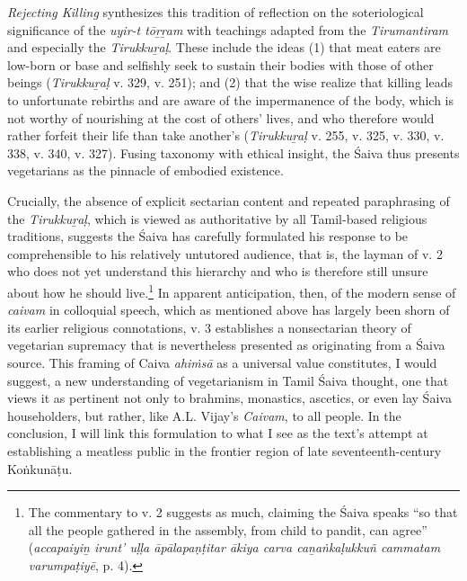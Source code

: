 \emph{Rejecting Killing} synthesizes this tradition of reflection on the soteriological significance of the \emph{uyir-t tōṟṟam} with teachings adapted from the \emph{{Tirumantiram}} and especially the \emph{{Tirukkuṟaḷ}}. These include the ideas (1) that meat eaters are low-born or base and selfishly seek to sustain their bodies with those of other beings (\emph{{Tirukkuṟaḷ}} v. 329, v. 251); and (2) that the wise realize that killing leads to unfortunate rebirths and are aware of the impermanence of the body, which is not worthy of nourishing at the cost of others’ lives, and who therefore would rather forfeit their life than take another’s (\emph{{Tirukkuṟaḷ}} v. 255, v. 325, v. 330, v. 338, v. 340, v. 327). Fusing taxonomy with ethical insight, the Śaiva thus presents vegetarians as the pinnacle of embodied existence. 


Crucially, the absence of explicit sectarian content and repeated paraphrasing of the \emph{{Tirukkuṟaḷ}}, which is viewed as authoritative by all Tamil-based religious traditions, suggests the Śaiva has carefully formulated his response to be comprehensible to his relatively untutored audience, that is, the layman of v. 2 who does not yet understand this hierarchy and who is therefore still unsure about how he should live.\footnote{%
The commentary to v. 2 suggests as much, claiming the Śaiva speaks “so that all the people gathered in the assembly, from child to pandit, can agree” (\emph{accapaiyiṉ irunt’ uḷḷa āpālapaṇṭitar ākiya carva caṉaṅkaḷukkuñ cammatam varumpaṭiyē}, p. 4). 
}
 In apparent anticipation, then, of the modern sense of \emph{caivam} in colloquial speech, which as mentioned above has largely been shorn of its earlier religious connotations, v. 3 establishes a nonsectarian theory of vegetarian supremacy that is nevertheless presented as originating from a Śaiva source. This framing of Caiva \emph{ahiṁsā} as a universal value constitutes, I would suggest, a new understanding of vegetarianism in Tamil Śaiva thought, one that views it as pertinent not only to brahmins, monastics, ascetics, or even lay Śaiva householders, but rather, like A.\thinskip{}L. Vijay’s \emph{{Caivam}}, to all people. In the conclusion, I will link this formulation to what I see as the text’s attempt at establishing a meatless public in the frontier region of late seventeenth-century Koṅkunāṭu.



